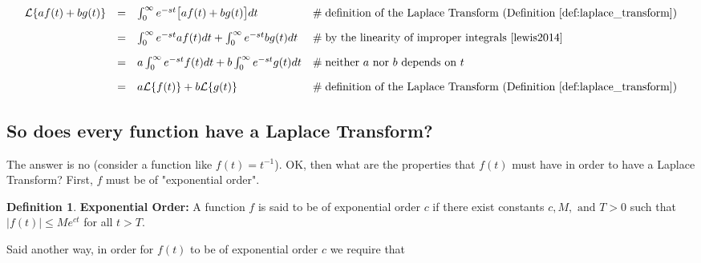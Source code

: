\documentclass{article}
\theoremstyle{definition}
\newtheorem{definition}{Definition}[section]
\begin{document}
\smallskip
\begin{equation*}
\begin{array}{lllll}
\mathcal{L}\{af(t) + bg(t)\} 
&=& \int_0^\infty e^{-st} \big [af (t) + bg(t) \big] dt                                & \mathrel{\#} \text{definition of the Laplace Transform (Definition \ref{def:laplace_transform})}                               \\  
[10pt]                                                                                                   %
&=& \int_0^\infty e^{-st} af (t)  dt + \int_0^\infty e^{-st}  bg(t)  dt          & \mathrel{\#} \text{by the linearity of improper integrals \cite{lewis2014}}                                                                 \\
[10pt]                                                                                                   %
&=& a \int_0^\infty e^{-st}  f(t) dt + b \int_0^\infty e^{-st}  g(t) dt          & \mathrel{\#} \text{neither $a$ nor $b$ depends on $t$}                                                                                           \\
[10pt]                                                                                                   %
&=& a \mathcal{L}\{f(t)\}  + b \mathcal{L}\{g(t)\}                                   & \mathrel{\#} \text{definition of the Laplace Transform (Definition \ref{def:laplace_transform})}
\end{array}
\end{equation*}



\smallskip
\subsection{So does every function have a Laplace Transform?}
The answer is no (consider a function like $f(t) = t^{-1}$). OK, then what are the properties that $f(t)$ must have in order to have a Laplace Transform? First, $f$ must
be of "exponential order". 


\bigskip
\begin{definition} 
{\bf Exponential Order:} A function $f$ is said to be of exponential order $c$ if there exist constants $c, M, \text{ and } T > 0$ such that $|f(t)| \leq Me^{ct}$ for all $t > T$.
\label{def:exponential_order}
\end{definition}

\bigskip
\noindent
Said another way, in order for $f(t)$ to be of exponential order $c$ we require that  
\end{document}
